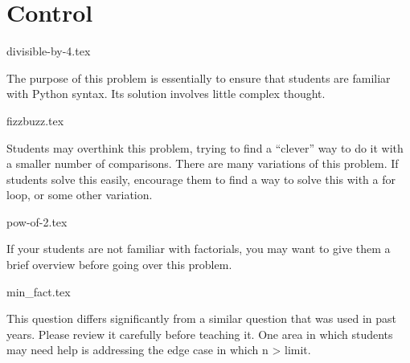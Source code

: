 \documentclass{exam}
\begin{document}
\section{Control}
\begin{questions}
{divisible-by-4.tex}
\begin{questionmeta}
  The purpose of this problem is essentially to ensure that students are familiar with Python syntax. Its solution involves little complex thought. 
\end{questionmeta}
{fizzbuzz.tex} 
\begin{questionmeta}
  Students may overthink this problem, trying to find a ``clever'' way to do it with a smaller number of comparisons.
  There are many variations of this problem. If students solve this easily, encourage them to find a way to solve this with a for loop, or some other variation.
\end{questionmeta}
{pow-of-2.tex}
\begin{questionmeta}
  If your students are not familiar with factorials, you may want to give them a brief overview before going over this problem. 
\end{questionmeta}
{min_fact.tex}
\begin{questionmeta}
  This question differs significantly from a similar question that was used in past years. Please review it carefully before teaching it.
  One area in which students may need help is addressing the edge case in which n > limit.
\end{questionmeta}
\end{questions}
\end{document}
